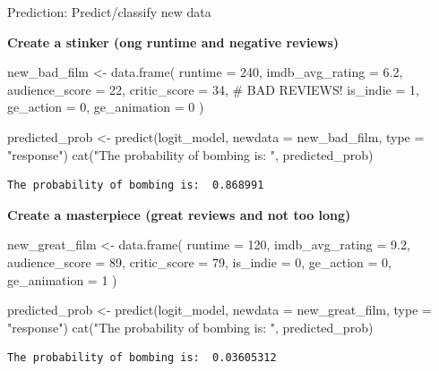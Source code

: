 \documentclass[
  10pt,
  ignorenonframetext,
]{beamer}
\newenvironment{Shaded}{\begin{snugshade}}{\end{snugshade}}
\newcommand{\AttributeTok}[1]{\textcolor[rgb]{0.40,0.45,0.13}{#1}}
\newcommand{\CommentTok}[1]{\textcolor[rgb]{0.37,0.37,0.37}{#1}}
\newcommand{\DecValTok}[1]{\textcolor[rgb]{0.68,0.00,0.00}{#1}}
\newcommand{\FloatTok}[1]{\textcolor[rgb]{0.68,0.00,0.00}{#1}}
\newcommand{\FunctionTok}[1]{\textcolor[rgb]{0.28,0.35,0.67}{#1}}
\newcommand{\NormalTok}[1]{\textcolor[rgb]{0.00,0.23,0.31}{#1}}
\newcommand{\OtherTok}[1]{\textcolor[rgb]{0.00,0.23,0.31}{#1}}
\newcommand{\StringTok}[1]{\textcolor[rgb]{0.13,0.47,0.30}{#1}}
\begin{document}
\begin{frame}[fragile]{Prediction: Predict/classify new data}
\label{prediction-predictclassify-new-data}
\scriptsize

\textbf{Create a stinker (ong runtime and negative reviews)}

\begin{Shaded}
\begin{Highlighting}[]
\NormalTok{new\_bad\_film }\OtherTok{\textless{}{-}} \FunctionTok{data.frame}\NormalTok{(}
  \AttributeTok{runtime =} \DecValTok{240}\NormalTok{,  }
  \AttributeTok{imdb\_avg\_rating =} \FloatTok{6.2}\NormalTok{, }\AttributeTok{audience\_score =} \DecValTok{22}\NormalTok{, }\AttributeTok{critic\_score =} \DecValTok{34}\NormalTok{,    }\CommentTok{\# BAD REVIEWS!}
  \AttributeTok{is\_indie =} \DecValTok{1}\NormalTok{, }\AttributeTok{ge\_action =} \DecValTok{0}\NormalTok{, }\AttributeTok{ge\_animation =} \DecValTok{0}
\NormalTok{)}

\NormalTok{predicted\_prob }\OtherTok{\textless{}{-}} \FunctionTok{predict}\NormalTok{(logit\_model, }\AttributeTok{newdata =}\NormalTok{ new\_bad\_film, }\AttributeTok{type =} \StringTok{"response"}\NormalTok{)}
\FunctionTok{cat}\NormalTok{(}\StringTok{"The probability of bombing is: "}\NormalTok{, predicted\_prob)}
\end{Highlighting}
\end{Shaded}

\begin{verbatim}
The probability of bombing is:  0.868991
\end{verbatim}

\textbf{Create a masterpiece (great reviews and not too long)}

\begin{Shaded}
\begin{Highlighting}[]
\NormalTok{new\_great\_film }\OtherTok{\textless{}{-}} \FunctionTok{data.frame}\NormalTok{(}
  \AttributeTok{runtime =} \DecValTok{120}\NormalTok{,  }
  \AttributeTok{imdb\_avg\_rating =} \FloatTok{9.2}\NormalTok{, }\AttributeTok{audience\_score =} \DecValTok{89}\NormalTok{, }\AttributeTok{critic\_score =} \DecValTok{79}\NormalTok{,    }
  \AttributeTok{is\_indie =} \DecValTok{0}\NormalTok{, }\AttributeTok{ge\_action =} \DecValTok{0}\NormalTok{, }\AttributeTok{ge\_animation =} \DecValTok{1}
\NormalTok{)}

\NormalTok{predicted\_prob }\OtherTok{\textless{}{-}} \FunctionTok{predict}\NormalTok{(logit\_model, }\AttributeTok{newdata =}\NormalTok{ new\_great\_film, }\AttributeTok{type =} \StringTok{"response"}\NormalTok{)}
\FunctionTok{cat}\NormalTok{(}\StringTok{"The probability of bombing is: "}\NormalTok{, predicted\_prob)}
\end{Highlighting}
\end{Shaded}

\begin{verbatim}
The probability of bombing is:  0.03605312
\end{verbatim}
\end{frame}
\end{document}
